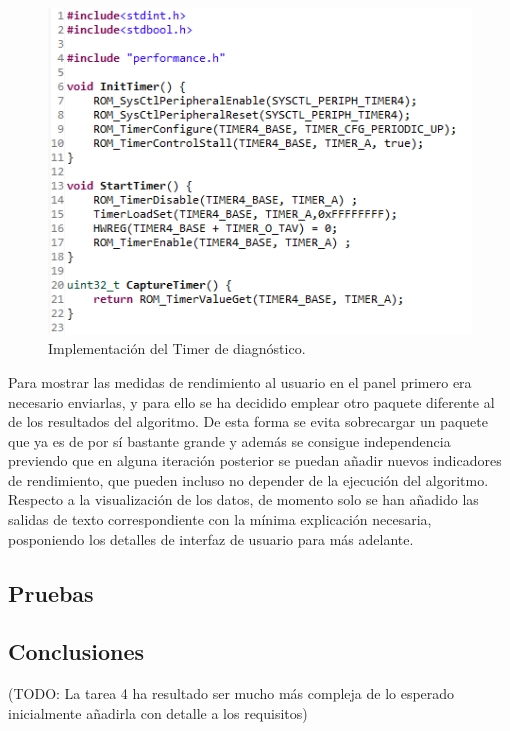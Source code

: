         \begin{figure}[H]
                \centering
                        \includegraphics[width = 0.7 \linewidth]{figuras/Timer.PNG}
                \caption{Implementación del Timer de diagnóstico.}
                \label{fig:timer}
        \end{figure}
        
        Para mostrar las medidas de rendimiento al usuario en el panel primero era necesario enviarlas, y para ello se ha decidido emplear otro paquete diferente al de los resultados del algoritmo. De esta forma se evita sobrecargar un paquete que ya es de por sí bastante grande y además se consigue independencia previendo que en alguna iteración posterior se puedan añadir nuevos indicadores de rendimiento, que pueden incluso no depender de la ejecución del algoritmo. Respecto a la visualización de los datos, de momento solo se han añadido las salidas de texto correspondiente con la mínima explicación necesaria, posponiendo los detalles de interfaz de usuario para más adelante.
        
    \subsection{Pruebas}
        
    \subsection{Conclusiones}
    
    (TODO: La tarea 4 ha resultado ser mucho más compleja de lo esperado inicialmente añadirla con detalle a los requisitos)